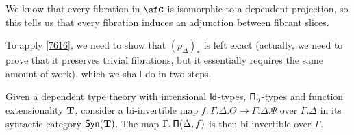 We know that every fibration in $\sfC$ is isomorphic to a dependent
projection, so this tells us that every fibration induces an adjunction
between fibrant slices.

To apply \ref{7616}, we need to show that $(p_\Delta)_*$ is left exact
(actually, we need to prove that it preserves trivial fibrations, but it
essentially requires the same amount of work), which we shall do in two steps.

\begin{lem}[\cite{KL18}]\label{wepreserved}
  Given a dependent type theory with intensional $\operatorname{\mathsf{Id}}$-types,
  $\operatorname{\mathsf{\Pi}}_\eta$-types and function extensionality $\operatorname{\mathbf{T}}$, consider a bi-invertible
  map $f\colon\Gamma.\Delta.\Theta\rightarrow\Gamma.\Delta.\Psi$ over
  $\Gamma.\Delta$ in its syntactic category $\mathsf{Syn}(\mathbf{T})$. The
  map $\Gamma.\operatorname{\mathsf{\Pi}}(\Delta,f)$ is then bi-invertible over $\Gamma$.
\end{lem}
